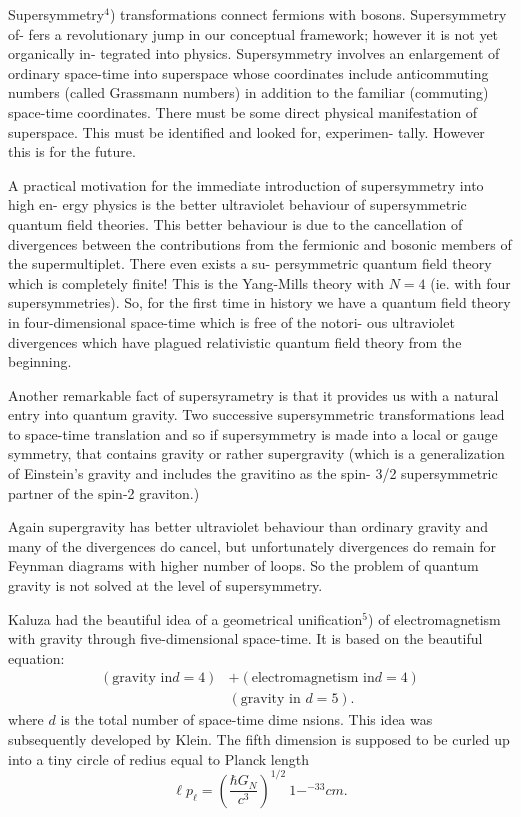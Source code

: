 Supersymmetry$^{4}$) transformations connect fermions with bosons. Supersymmetry of-
fers a revolutionary jump in our conceptual framework; however it is not yet organically in-
tegrated into physics. Supersymmetry involves an enlargement of ordinary space-time into
superspace whose coordinates include anticommuting numbers (called Grassmann numbers)
in addition to the familiar (commuting) space-time coordinates. There must be some direct
physical manifestation of superspace. This must be identified and looked for, experimen-
tally. However this is for the future.

A practical motivation for the immediate introduction of supersymmetry into high en-
ergy physics is the better ultraviolet behaviour of supersymmetric quantum field theories.
This better behaviour is due to the cancellation of divergences between the contributions
from the fermionic and bosonic members of the supermultiplet. There even exists a su-
persymmetric quantum field theory which is completely finite! This is the Yang-Mills
theory with $N = 4$ (ie. with four supersymmetries). So, for the first time in history we
have a quantum field theory in four-dimensional space-time which is free of the notori-
ous ultraviolet divergences which have plagued relativistic quantum field theory from the
beginning.

Another remarkable fact of supersyrametry is that it provides us with a natural entry
into quantum gravity. Two successive supersymmetric transformations lead to space-time
translation and so if supersymmetry is made into a local or gauge symmetry, that contains
gravity or rather supergravity (which is a generalization of Einstein’s gravity and includes
the gravitino as the spin- 3/2 supersymmetric partner of the spin-2 graviton.)

Again supergravity has better ultraviolet behaviour than ordinary gravity and many of
the divergences do cancel, but unfortunately divergences do remain for Feynman diagrams
with higher number of loops. So the problem of quantum gravity is not solved at the level
of supersymmetry.

Kaluza had the beautiful idea of a geometrical unification$^{5}$) of electromagnetism with
gravity through five-dimensional space-time. It is based on the beautiful equation:
\begin{align*}
(\text{gravity in} d = 4) &+ (\text{electromagnetism in} d=4)\\
                          & (\text{gravity in } d = 5). 
\end{align*}
where $d$
is the total number of space-time dime
nsions. This idea was subsequently
developed by Klein. The fifth dimension
is supposed to be curled up into a tiny
circle of redius
equal to Planck length
$$
\ell p_{\ell} = \left(\frac{\hbar G_{N}}{c^{3}}\right)^{1/2} ~ 1-^{-33} cm.
$$

